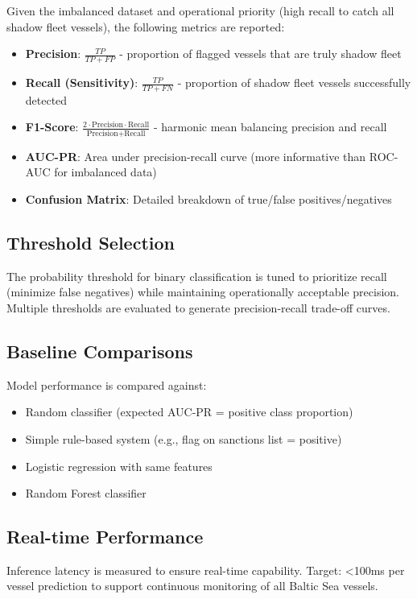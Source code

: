 Given the imbalanced dataset and operational priority (high recall to catch all shadow fleet vessels), the following metrics are reported:

\begin{itemize}
    \item \textbf{Precision}: $\frac{TP}{TP + FP}$ - proportion of flagged vessels that are truly shadow fleet
    \item \textbf{Recall (Sensitivity)}: $\frac{TP}{TP + FN}$ - proportion of shadow fleet vessels successfully detected
    \item \textbf{F1-Score}: $\frac{2 \cdot \text{Precision} \cdot \text{Recall}}{\text{Precision} + \text{Recall}}$ - harmonic mean balancing precision and recall
    \item \textbf{AUC-PR}: Area under precision-recall curve (more informative than ROC-AUC for imbalanced data)
    \item \textbf{Confusion Matrix}: Detailed breakdown of true/false positives/negatives
\end{itemize}

\subsection{Threshold Selection}
The probability threshold for binary classification is tuned to prioritize recall (minimize false negatives) while maintaining operationally acceptable precision. Multiple thresholds are evaluated to generate precision-recall trade-off curves.

\subsection{Baseline Comparisons}
Model performance is compared against:
\begin{itemize}
    \item Random classifier (expected AUC-PR = positive class proportion)
    \item Simple rule-based system (e.g., flag on sanctions list = positive)
    \item Logistic regression with same features
    \item Random Forest classifier
\end{itemize}

\subsection{Real-time Performance}
Inference latency is measured to ensure real-time capability. Target: <100ms per vessel prediction to support continuous monitoring of all Baltic Sea vessels.